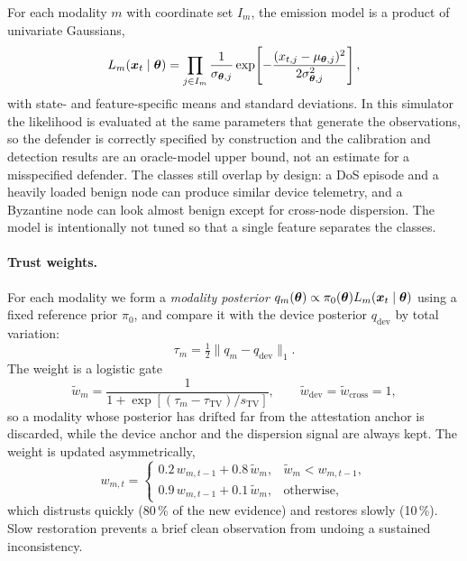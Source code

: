For each modality $m$ with coordinate set $I_m$, the emission model is a product
of univariate Gaussians,
\begin{equation}
  L_m(\boldsymbol{x}_t\mid\boldsymbol{\theta})
  =\prod_{j\in I_m}\frac{1}{\sigma_{\boldsymbol{\theta},j}}
    \exp\!\left[-\frac{(x_{t,j}-\mu_{\boldsymbol{\theta},j})^2}{2\sigma_{\boldsymbol{\theta},j}^2}\right],
  \label{eq:emission}
\end{equation}
with state- and feature-specific means and standard deviations. In this
simulator the likelihood is evaluated at the same parameters that generate the
observations, so the defender is correctly specified by construction and the
calibration and detection results are an oracle-model upper bound, not an
estimate for a misspecified defender. The classes still overlap by design: a DoS episode and a heavily loaded benign node can produce
similar device telemetry, and a Byzantine node can look almost benign except for
cross-node dispersion. The model is intentionally not tuned so that a single
feature separates the classes.

\paragraph{Trust weights.} For each modality we form a \emph{modality posterior}
$q_m(\boldsymbol{\theta})\propto \pi_0(\boldsymbol{\theta})L_m(\boldsymbol{x}_t\mid\boldsymbol{\theta})$ using a fixed reference
prior $\pi_0$, and compare it with the device posterior $q_{\mathrm{dev}}$ by
total variation:
\begin{equation}
  \tau_m = \tfrac12\lVert q_m-q_{\mathrm{dev}}\rVert_1 .
  \label{eq:tv}
\end{equation}
The weight is a logistic gate
\begin{equation}
  \tilde w_m = \frac{1}{1+\exp[(\tau_m-\tau_{\mathrm{TV}})/s_{\mathrm{TV}}]},
  \qquad \tilde w_{\mathrm{dev}}=\tilde w_{\mathrm{cross}}=1 ,
  \label{eq:weight}
\end{equation}
so a modality whose posterior has drifted far from the attestation anchor is
discarded, while the device anchor and the dispersion signal are always kept.
The weight is updated asymmetrically,
\begin{equation}
  w_{m,t}=
  \begin{cases}
    0.2\,w_{m,t-1}+0.8\,\tilde w_m, & \tilde w_m<w_{m,t-1},\\
    0.9\,w_{m,t-1}+0.1\,\tilde w_m, & \text{otherwise},
  \end{cases}
  \label{eq:asym}
\end{equation}
which distrusts quickly (80\,\% of the new evidence) and restores slowly
(10\,\%). Slow restoration prevents a brief clean observation from undoing a
sustained inconsistency.

